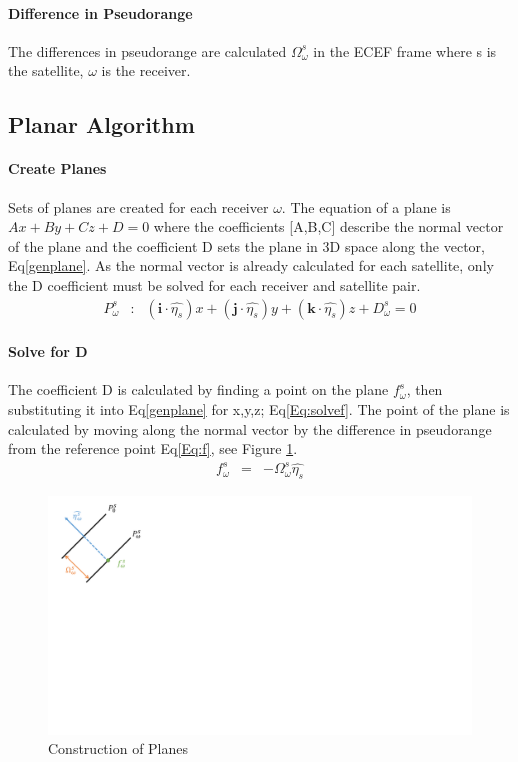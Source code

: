 \paragraph{Difference in Pseudorange}
The differences in pseudorange are calculated $\Omega^s_\omega$ in the ECEF frame where s is the satellite, $\omega$ is the receiver.


\subsection{Planar Algorithm}
\paragraph{Create Planes}
Sets of planes are created for each receiver $\omega$. The equation of a plane is $Ax+By+Cz+D=0$ where the coefficients [A,B,C] describe the normal vector of the plane and the coefficient D sets the plane in 3D space along the vector, Eq\eqref{genplane}. As the normal vector is already calculated for each satellite, only the D coefficient must be solved for each receiver and satellite pair. 
\begin{eqnarray}
P_\omega^s &:& (\textbf{i}\cdot\hat{\eta_s})x + (\textbf{j}\cdot\hat{\eta_s})y + (\textbf{k}\cdot\hat{\eta_s})z + D_\omega^s \label{genplane} = 0
\end{eqnarray}

\paragraph{Solve for D}
The coefficient D is calculated by finding a point on the plane $f_\omega^s$, then substituting it into Eq\eqref{genplane} for x,y,z; Eq\eqref{Eq:solvef}. The point of the plane is calculated by moving along the normal vector by the difference in pseudorange from the reference point Eq\eqref{Eq:f}, see Figure \ref{fig:solvef}.
\begin{eqnarray}
f_\omega^s &=& -\Omega_\omega^s\hat{\eta_s} \label{Eq:f}
\end{eqnarray}

\begin{figure}[t]
\centering
\caption{Construction of Planes}
\label{fig:solvef}
\includegraphics[trim=0 12cm 26cm 0,clip,width =0.6\linewidth]{ChapterPerception/Figures/solveF.pdf}
\end{figure}


